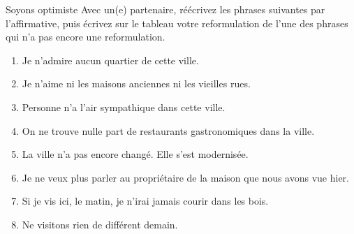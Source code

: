 \begin{frame}{Soyons optimiste}
  Avec un(e) partenaire, réécrivez les phrases suivantes par l'affirmative, puis \alert{écrivez sur le tableau} votre reformulation de l'une des phrases qui n'a pas encore une reformulation.
  \begin{enumerate}
    \item Je n'admire aucun quartier de cette ville.
    \item Je n'aime ni les maisons anciennes ni les vieilles rues.
    \item Personne n'a l'air sympathique dans cette ville.
    \item On ne trouve nulle part de restaurants gastronomiques dans la ville.
    \item La ville n'a pas encore changé. Elle s'est modernisée.
    \item Je ne veux plus parler au propriétaire de la maison que nous avons vue hier.
    \item Si je vis ici, le matin, je n'irai jamais courir dans les bois.
    \item Ne visitons rien de différent demain.
  \end{enumerate}
\end{frame}